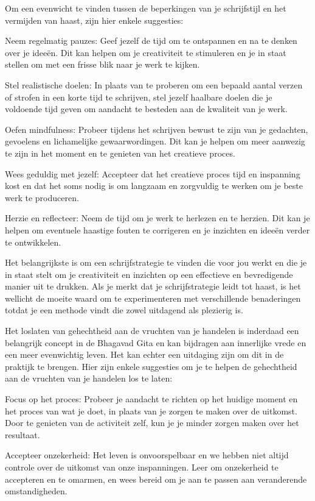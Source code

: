 Om een evenwicht te vinden tussen de beperkingen van je schrijfstijl en het vermijden van haast, zijn hier enkele suggesties:

Neem regelmatig pauzes: Geef jezelf de tijd om te ontspannen en na te denken over je ideeën. Dit kan helpen om je creativiteit te stimuleren en je in staat stellen om met een frisse blik naar je werk te kijken.

Stel realistische doelen: In plaats van te proberen om een bepaald aantal verzen of strofen in een korte tijd te schrijven, stel jezelf haalbare doelen die je voldoende tijd geven om aandacht te besteden aan de kwaliteit van je werk.

Oefen mindfulness: Probeer tijdens het schrijven bewust te zijn van je gedachten, gevoelens en lichamelijke gewaarwordingen. Dit kan je helpen om meer aanwezig te zijn in het moment en te genieten van het creatieve proces.

Wees geduldig met jezelf: Accepteer dat het creatieve proces tijd en inspanning kost en dat het soms nodig is om langzaam en zorgvuldig te werken om je beste werk te produceren.

Herzie en reflecteer: Neem de tijd om je werk te herlezen en te herzien. Dit kan je helpen om eventuele haastige fouten te corrigeren en je inzichten en ideeën verder te ontwikkelen.

Het belangrijkste is om een schrijfstrategie te vinden die voor jou werkt en die je in staat stelt om je creativiteit en inzichten op een effectieve en bevredigende manier uit te drukken. Als je merkt dat je schrijfstrategie leidt tot haast, is het wellicht de moeite waard om te experimenteren met verschillende benaderingen totdat je een methode vindt die zowel uitdagend als plezierig is.

Het loslaten van gehechtheid aan de vruchten van je handelen is inderdaad een belangrijk concept in de Bhagavad Gita en kan bijdragen aan innerlijke vrede en een meer evenwichtig leven. Het kan echter een uitdaging zijn om dit in de praktijk te brengen. Hier zijn enkele suggesties om je te helpen de gehechtheid aan de vruchten van je handelen los te laten:

Focus op het proces: Probeer je aandacht te richten op het huidige moment en het proces van wat je doet, in plaats van je zorgen te maken over de uitkomst. Door te genieten van de activiteit zelf, kun je je minder zorgen maken over het resultaat.

Accepteer onzekerheid: Het leven is onvoorspelbaar en we hebben niet altijd controle over de uitkomst van onze inspanningen. Leer om onzekerheid te accepteren en te omarmen, en wees bereid om je aan te passen aan veranderende omstandigheden.

